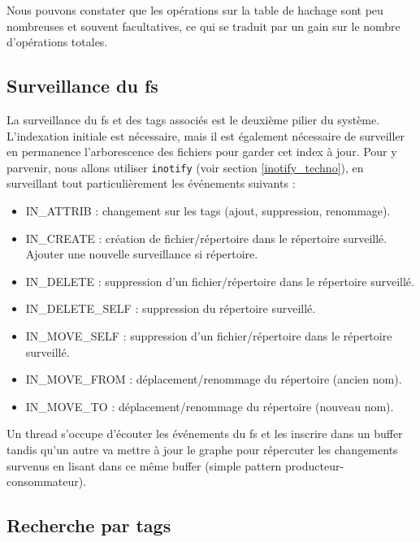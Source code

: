\documentclass[a4paper, 12pt]{article}
\begin{document}
Nous pouvons constater que les opérations sur la table de hachage sont peu nombreuses et souvent 
facultatives, ce qui se traduit par un gain sur le nombre d'opérations totales.

\subsection{Surveillance du \acrshort{fs}}
La surveillance du \acrshort{fs} et des tags associés est le deuxième pilier du système. 
L'indexation initiale est nécessaire, mais il est également nécessaire de surveiller en permanence 
l'arborescence des fichiers pour garder cet index à jour. Pour y parvenir, nous allons utiliser 
\texttt{inotify} (voir section \ref{inotify_techno}), en surveillant tout particulièrement les événements 
suivants :
\begin{itemize}
    \item IN\_ATTRIB : changement sur les tags (ajout, suppression, renommage).
    \item IN\_CREATE : création de fichier/répertoire dans le répertoire surveillé. Ajouter une nouvelle surveillance si répertoire.
    \item IN\_DELETE : suppression d'un fichier/répertoire dans le répertoire surveillé.
    \item IN\_DELETE\_SELF : suppression du répertoire surveillé.
    \item IN\_MOVE\_SELF : suppression d'un fichier/répertoire dans le répertoire surveillé.
    \item IN\_MOVE\_FROM : déplacement/renommage du répertoire (ancien nom).
    \item IN\_MOVE\_TO : déplacement/renommage du répertoire (nouveau nom).
\end{itemize}
Un thread s'occupe d'écouter les événements du \acrshort{fs} et les inscrire dans un buffer 
tandis qu'un autre va mettre à jour le graphe pour répercuter les changements survenus en lisant 
dans ce même buffer (simple pattern producteur-consommateur).

\subsection{Recherche par tags}

\newpage
\end{document}
